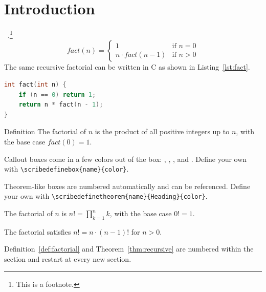 \section{Introduction}\label{sec:introduction}

\lipsum[1]~\cite{Scribe25}.\footnote{This is a footnote.}
\begin{equation*}
	fact(n) = \begin{cases}
		1                 & \text{if } n = 0 \\
		n \cdot fact(n-1) & \text{if } n > 0
	\end{cases}
\end{equation*}
The same recursive factorial can be written in C as shown in Listing~\ref{lst:fact}.
\begin{lstlisting}[language=C, caption={A recursive factorial in C, mirroring the definition above.}, label={lst:fact}]
int fact(int n) {
    if (n == 0) return 1;
    return n * fact(n - 1);
}
\end{lstlisting}

\begin{infobox}{Definition}
	The factorial of $n$ is the product of all positive integers up to $n$, with the base case $fact(0) = 1$.
\end{infobox}

\noindent Callout boxes come in a few colors out of the box: , , , and . Define your own with \texttt{\textbackslash scribedefinebox\{name\}\{color\}}.

\noindent Theorem-like boxes are numbered automatically and can be referenced. Define your own with \texttt{\textbackslash scribedefinetheorem\{name\}\{Heading\}\{color\}}.

\begin{definitionbox}[Factorial]\label{def:factorial}
	The factorial of $n$ is $n! = \prod_{k=1}^{n} k$, with the base case $0! = 1$.
\end{definitionbox}

\begin{theorembox}\label{thm:recursive}
	The factorial satisfies $n! = n \cdot (n-1)!$ for $n > 0$.
\end{theorembox}

\noindent Definition~\ref{def:factorial} and Theorem~\ref{thm:recursive} are numbered within the section and restart at every new section.

\lipsum[1]
\lipsum[2]

